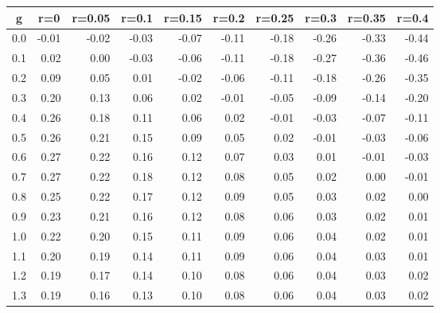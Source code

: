 %
\begin{table}[!tbp]
 \begin{center}
 \begin{tabular}{rrrrrrrrrr}\hline\hline
\multicolumn{1}{c}{g}&\multicolumn{1}{c}{r=0}&\multicolumn{1}{c}{r=0.05}&\multicolumn{1}{c}{r=0.1}&\multicolumn{1}{c}{r=0.15}&\multicolumn{1}{c}{r=0.2}&\multicolumn{1}{c}{r=0.25}&\multicolumn{1}{c}{r=0.3}&\multicolumn{1}{c}{r=0.35}&\multicolumn{1}{c}{r=0.4}\tabularnewline
\hline
0.0&-0.01&-0.02&-0.03&-0.07&-0.11&-0.18&-0.26&-0.33&-0.44\tabularnewline
0.1& 0.02& 0.00&-0.03&-0.06&-0.11&-0.18&-0.27&-0.36&-0.46\tabularnewline
0.2& 0.09& 0.05& 0.01&-0.02&-0.06&-0.11&-0.18&-0.26&-0.35\tabularnewline
0.3& 0.20& 0.13& 0.06& 0.02&-0.01&-0.05&-0.09&-0.14&-0.20\tabularnewline
0.4& 0.26& 0.18& 0.11& 0.06& 0.02&-0.01&-0.03&-0.07&-0.11\tabularnewline
0.5& 0.26& 0.21& 0.15& 0.09& 0.05& 0.02&-0.01&-0.03&-0.06\tabularnewline
0.6& 0.27& 0.22& 0.16& 0.12& 0.07& 0.03& 0.01&-0.01&-0.03\tabularnewline
0.7& 0.27& 0.22& 0.18& 0.12& 0.08& 0.05& 0.02& 0.00&-0.01\tabularnewline
0.8& 0.25& 0.22& 0.17& 0.12& 0.09& 0.05& 0.03& 0.02& 0.00\tabularnewline
0.9& 0.23& 0.21& 0.16& 0.12& 0.08& 0.06& 0.03& 0.02& 0.01\tabularnewline
1.0& 0.22& 0.20& 0.15& 0.11& 0.09& 0.06& 0.04& 0.02& 0.01\tabularnewline
1.1& 0.20& 0.19& 0.14& 0.11& 0.09& 0.06& 0.04& 0.03& 0.01\tabularnewline
1.2& 0.19& 0.17& 0.14& 0.10& 0.08& 0.06& 0.04& 0.03& 0.02\tabularnewline
1.3& 0.19& 0.16& 0.13& 0.10& 0.08& 0.06& 0.04& 0.03& 0.02\tabularnewline
\hline
\end{tabular}

\end{center}

\end{table}

